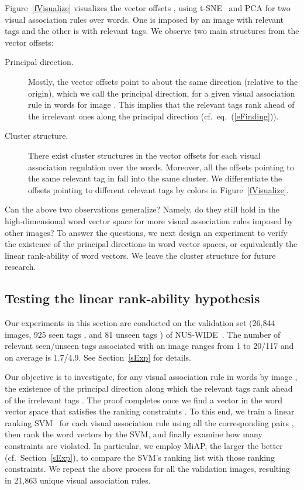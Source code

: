 \documentclass[10pt,twocolumn,letterpaper]{article}
\begin{document}
Figure~\ref{fVisualize} visualizes the vector offsets ,  using t-SNE~\cite{van_der_maaten_visualizing_2008} and PCA for two  visual association rules over words. One is imposed by an image with  relevant tags and the other is with  relevant tags. We observe  two main structures from the vector offsets:
\vspace{-5pt}
\begin{description}
\item[Principal direction.] Mostly, the vector offsets point to about the same direction (relative to the origin), which we call the principal direction, for a given  visual association rule  in words for image . This implies that the relevant tags  rank ahead of the irrelevant ones   along the principal direction (cf.\ eq.~(\ref{eFinding})).
\vspace{-15pt}
\item[Cluster structure.] There exist cluster structures in the vector offsets for each visual association regulation over the words. Moreover, all the offsets pointing to the same relevant tag in  fall into the same cluster. We differentiate the offsets pointing to different relevant tags by colors in Figure~\ref{fVisualize}.
\vspace{-5pt}
\end{description}
{Can the above two observations generalize? Namely, do they still hold in the high-dimensional word vector space for more visual association rules imposed by other images?} To answer the questions, we next design an experiment to verify the existence of the principal directions in word vector spaces, or equivalently the linear rank-ability of word vectors. We leave the cluster structure for future research. 



\subsection{Testing the linear rank-ability hypothesis}
Our experiments in this section are conducted on the validation set (26,844 images, 925 seen tags , and 81 unseen tags ) of NUS-WIDE~\cite{chua_nus-wide:_2009}. The number of relevant seen/unseen tags associated with an image ranges from 1 to 20/117 and on average is 1.7/4.9. See Section~\ref{sExp} for details.

Our objective is to investigate, for any visual association rule  in words by image , the existence of the principal direction along which the relevant tags   rank ahead of the irrelevant tags . The proof completes once we find a vector  in the word vector space that satisfies the ranking constraints . To this end, we train a linear ranking SVM~\cite{joachims_optimizing_2002} for each visual association rule using all the corresponding pairs , then rank the word vectors by the SVM, and finally examine how many constraints are violated. In particular, we employ MiAP, the larger the better (cf.\ Section~\ref{sExp}), to compare the SVM's ranking list with those ranking constraints. We repeat the above process for all the validation images, resulting in 21,863 unique visual association rules.
\end{document}
